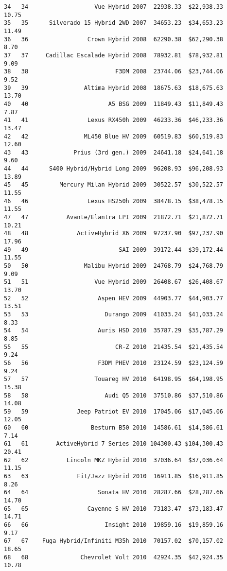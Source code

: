 \documentclass[
  letterpaper,
  DIV=11,
  numbers=noendperiod]{scrreprt}
\begin{document}
\begin{verbatim}
34   34                   Vue Hybrid 2007  22938.33  $22,938.33       10.75
35   35      Silverado 15 Hybrid 2WD 2007  34653.23  $34,653.23       11.49
36   36                 Crown Hybrid 2008  62290.38  $62,290.38        8.70
37   37     Cadillac Escalade Hybrid 2008  78932.81  $78,932.81        9.09
38   38                         F3DM 2008  23744.06  $23,744.06        9.52
39   39                Altima Hybrid 2008  18675.63  $18,675.63       13.70
40   40                       A5 BSG 2009  11849.43  $11,849.43        7.87
41   41                 Lexus RX450h 2009  46233.36  $46,233.36       13.47
42   42                ML450 Blue HV 2009  60519.83  $60,519.83       12.60
43   43             Prius (3rd gen.) 2009  24641.18  $24,641.18        9.60
44   44      S400 Hybrid/Hybrid Long 2009  96208.93  $96,208.93       13.89
45   45         Mercury Milan Hybrid 2009  30522.57  $30,522.57       11.55
46   46                 Lexus HS250h 2009  38478.15  $38,478.15       11.55
47   47           Avante/Elantra LPI 2009  21872.71  $21,872.71       10.21
48   48              ActiveHybrid X6 2009  97237.90  $97,237.90       17.96
49   49                          SAI 2009  39172.44  $39,172.44       11.55
50   50                Malibu Hybrid 2009  24768.79  $24,768.79        9.09
51   51                   Vue Hybrid 2009  26408.67  $26,408.67       13.70
52   52                    Aspen HEV 2009  44903.77  $44,903.77       13.51
53   53                      Durango 2009  41033.24  $41,033.24        8.33
54   54                    Auris HSD 2010  35787.29  $35,787.29        8.85
55   55                         CR-Z 2010  21435.54  $21,435.54        9.24
56   56                    F3DM PHEV 2010  23124.59  $23,124.59        9.24
57   57                   Touareg HV 2010  64198.95  $64,198.95       15.38
58   58                      Audi Q5 2010  37510.86  $37,510.86       14.08
59   59              Jeep Patriot EV 2010  17045.06  $17,045.06       12.05
60   60                  Besturn B50 2010  14586.61  $14,586.61        7.14
61   61        ActiveHybrid 7 Series 2010 104300.43 $104,300.43       20.41
62   62           Lincoln MKZ Hybrid 2010  37036.64  $37,036.64       11.15
63   63              Fit/Jazz Hybrid 2010  16911.85  $16,911.85        8.26
64   64                    Sonata HV 2010  28287.66  $28,287.66       14.70
65   65                 Cayenne S HV 2010  73183.47  $73,183.47       14.71
66   66                      Insight 2010  19859.16  $19,859.16        9.17
67   67    Fuga Hybrid/Infiniti M35h 2010  70157.02  $70,157.02       18.65
68   68               Chevrolet Volt 2010  42924.35  $42,924.35       10.78

\end{verbatim}
\end{document}
